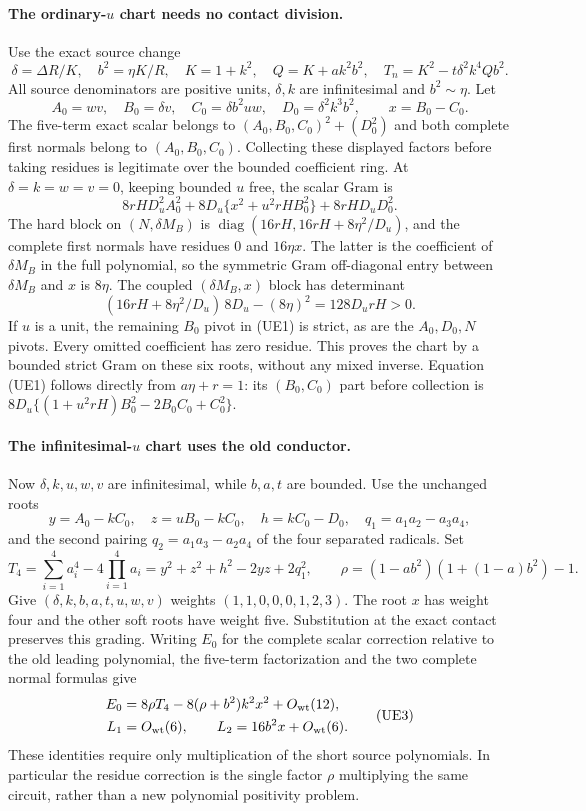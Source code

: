 \paragraph{The ordinary-$u$ chart needs no contact division.}
Use the exact source change
\[
 \delta=\Delta R/K,\quad b^2=\eta K/R,\quad K=1+k^2,
 \quad Q=K+ak^2b^2,\quad T_n=K^2-t\delta^2k^4Qb^2.
\]
All source denominators are positive units, $\delta,k$ are
infinitesimal and $b^2\sim\eta$. Let
\[
 A_0=wv,\quad B_0=\delta v,\quad C_0=\delta b^2uw,
 \quad D_0=\delta^2k^3b^2,\qquad x=B_0-C_0.
\]
The five-term exact scalar belongs to
$(A_0,B_0,C_0)^2+(D_0^2)$ and both complete first normals belong
to $(A_0,B_0,C_0)$. Collecting these displayed factors before taking
residues is legitimate over the bounded coefficient ring. At
$\delta=k=w=v=0$, keeping bounded $u$ free, the scalar Gram is
\[
 8rH D_u^2A_0^2+
 8D_u\{x^2+u^2rH B_0^2\}+8rH D_uD_0^2.
 \tag{UE1}
\]
The hard block on $(N,\delta M_B)$ is
$\operatorname{diag}(16rH,16rH+8\eta^2/D_u)$, and the complete
first normals have residues $0$ and $16\eta x$. The latter is the
coefficient of $\delta M_B$ in the full polynomial, so the symmetric
Gram off-diagonal entry between $\delta M_B$ and $x$ is $8\eta$.
The coupled $(\delta M_B,x)$ block has determinant
\[
 (16rH+8\eta^2/D_u)\,8D_u-(8\eta)^2=128D_urH>0.
 \tag{UE2}
\]
If $u$ is a unit, the remaining $B_0$ pivot in (UE1) is strict,
as are the $A_0,D_0,N$ pivots. Every omitted coefficient has zero
residue. This proves the chart by a bounded strict Gram on these
six roots, without any mixed inverse. Equation (UE1) follows directly
from $a\eta+r=1$: its $(B_0,C_0)$ part before collection is
$8D_u\{(1+u^2rH)B_0^2-2B_0C_0+C_0^2\}$.

\paragraph{The infinitesimal-$u$ chart uses the old conductor.}
Now $\delta,k,u,w,v$ are infinitesimal, while $b,a,t$ are bounded.
Use the unchanged roots
\[
 y=A_0-kC_0,\quad z=uB_0-kC_0,\quad h=kC_0-D_0,
 \quad q_1=a_1a_2-a_3a_4,
\]
and the second pairing $q_2=a_1a_3-a_2a_4$ of the four separated
radicals. Set
\[
 T_4=\sum_{i=1}^4a_i^4-4\prod_{i=1}^4a_i
     =y^2+z^2+h^2-2yz+2q_1^2,
 \qquad \rho=(1-ab^2)(1+(1-a)b^2)-1.
\]
Give $(\delta,k,b,a,t,u,w,v)$ weights $(1,1,0,0,0,1,2,3)$.
The root $x$ has weight four and the other soft roots have weight
five. Substitution at the exact contact preserves this grading.
Writing $E_0$ for the complete scalar correction relative to the
old leading polynomial, the five-term factorization and the two
complete normal formulas give
\[
 \begin{aligned}
 E_0&=8\rho T_4-8(\rho+b^2)k^2x^2+O_{\rm wt}(12),\\
 L_1&=O_{\rm wt}(6),\qquad
 L_2=16b^2x+O_{\rm wt}(6).
 \end{aligned}\tag{UE3}
\]
These identities require only multiplication of the short source
polynomials. In particular the residue correction is the single
factor $\rho$ multiplying the same circuit, rather than a new
polynomial positivity problem.

